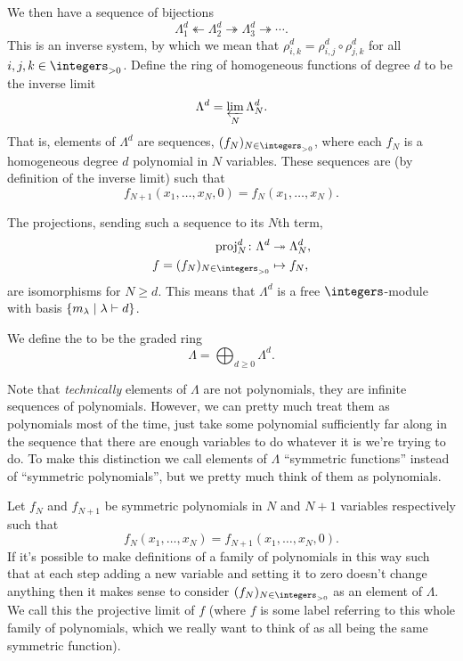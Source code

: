 We then have a sequence of bijections
\begin{equation}
    \Lambda_1^d \twoheadleftarrow \Lambda_2^d \twoheadrightarrow \Lambda_3^d \twoheadrightarrow \dotsb.
\end{equation}
This is an inverse system, by which we mean that \(\rho^d_{i,k} = \rho^d_{i,j} \circ \rho^d_{j,k}\) for all \(i, j, k \in \integers_{>0}\).
Define the ring of homogeneous functions of degree \(d\) to be the inverse limit
\begin{equation}
    \Lambda^d = \varprojlim_N \Lambda_N^d.
\end{equation}
That is, elements of \(\Lambda^d\) are sequences, \((f_N)_{N \in \integers_{> 0}}\), where each \(f_N\) is a homogeneous degree \(d\) polynomial in \(N\) variables.
These sequences are (by definition of the inverse limit) such that
\begin{equation}
    f_{N+1}(x_1, \dotsc, x_N, 0) = f_N(x_1, \dotsc, x_N).
\end{equation}

The projections, sending such a sequence to its \(N\)th term,
\begin{align}
    \proj^d_N \colon \Lambda^d &\twoheadrightarrow \Lambda^d_N,\\
    f = (f_N)_{N \in \integers_{>0}} &\mapsto f_N,
\end{align}
are isomorphisms for \(N \ge d\).
This means that \(\Lambda^d\) is a free \(\integers\)-module with basis \(\{m_\lambda \mid \lambda \vdash d\}\).

We define the  to be the graded ring
\begin{equation}
    \Lambda = \bigoplus_{d \ge 0} \Lambda^d.
\end{equation}

\begin{remark}{}{}
    Note that \emph{technically} elements of \(\Lambda\) are not polynomials, they are infinite sequences of polynomials.
    However, we can pretty much treat them as polynomials most of the time, just take some polynomial sufficiently far along in the sequence that there are enough variables to do whatever it is we're trying to do.
    To make this distinction we call elements of \(\Lambda\) \enquote{symmetric functions} instead of \enquote{symmetric polynomials}, but we pretty much think of them as polynomials.
    
    Let \(f_N\) and \(f_{N+1}\) be symmetric polynomials in \(N\) and \(N + 1\) variables respectively such that
    \begin{equation}
        f_N(x_1, \dotsc, x_N) = f_{N+1}(x_1, \dotsc, x_N, 0).
    \end{equation}
    If it's possible to make definitions of a family of polynomials in this way such that at each step adding a new variable and setting it to zero doesn't change anything then it makes sense to consider \((f_N)_{N \in \integers_{>0}}\) as an element of \(\Lambda\).
    We call this the projective limit of \(f\) (where \(f\) is some label referring to this whole family of polynomials, which we really want to think of as all being the same symmetric function).
\end{remark}

